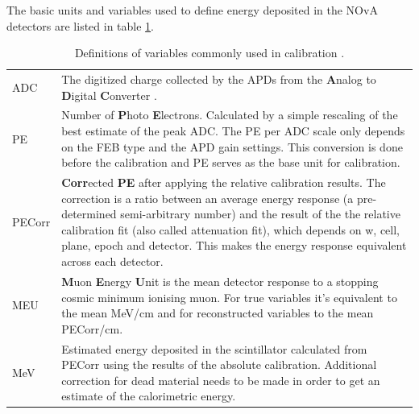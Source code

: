 The basic units and variables used to define energy deposited in the NOvA detectors are listed in table \ref{tabCalibrationVars}.
\begin{table}[!ht]
\centering
\def\arraystretch{1.4}
\begin{tabular}{m{} m{}}
ADC & The digitized charge collected by the APDs from the \textbf{A}nalog to \textbf{D}igital \textbf{C}onverter \cite{NOVA-doc-13518}.\\
PE & Number of \textbf{P}hoto \textbf{E}lectrons. Calculated by a simple rescaling of the best estimate of the peak ADC. The PE per ADC scale only depends on the FEB type and the APD gain settings. This conversion is done before the calibration and PE serves as the base unit for calibration.\\
PECorr & \textbf{Corr}ected \textbf{PE} after applying the relative calibration results. The correction is a ratio between an average energy response (a pre-determined semi-arbitrary number) and the result of the the relative calibration fit (also called attenuation fit), which depends on w, cell, plane, epoch and detector. This makes the energy response equivalent across each detector.\\
MEU & \textbf{M}uon \textbf{E}nergy \textbf{U}nit is the mean detector response to a stopping cosmic minimum ionising muon.  For true variables it's equivalent to the mean MeV/cm and for reconstructed variables to the mean PECorr/cm.\\
MeV & Estimated energy deposited in the scintillator calculated from PECorr using the results of the absolute calibration. Additional correction for dead material needs to be made in order to get an estimate of the calorimetric energy.
\end{tabular}
\caption{Definitions of variables commonly used in calibration \cite{NOVA-doc-13579,NOVA-doc-7410}.}
\label{tabCalibrationVars}
\end{table}

